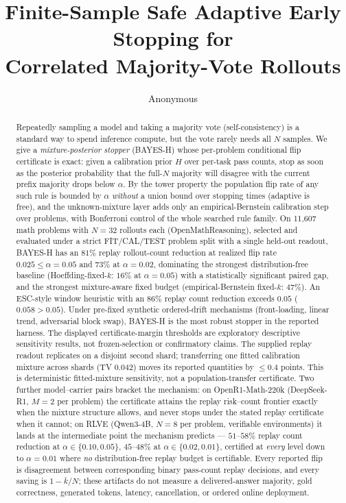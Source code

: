 \documentclass{article}
\title{Finite-Sample Safe Adaptive Early Stopping for\\
Correlated Majority-Vote Rollouts}
\author{Anonymous}
\date{}
\theoremstyle{definition}
\theoremstyle{remark}
\begin{document}
\maketitle

\begin{abstract}
Repeatedly sampling a model and taking a majority vote (self-consistency) is a
standard way to spend inference compute, but the vote rarely needs all $N$
samples. We give a
\emph{mixture-posterior stopper} (BAYES-H) whose per-problem conditional flip
certificate is exact: given a calibration prior $H$ over per-task pass counts,
stop as soon as the posterior probability that the full-$N$ majority will
disagree with the current prefix majority drops below $\alpha$. By the tower
property the population flip rate of any such rule is bounded by $\alpha$
\emph{without} a union bound over stopping times (adaptive is free), and the
unknown-mixture layer adds only an empirical-Bernstein calibration step over
problems, with Bonferroni control of the whole searched rule family.
On 11{,}607 math problems with $N=32$ rollouts each (OpenMathReasoning),
selected and evaluated under a strict FIT/CAL/TEST problem split with a single
held-out readout, BAYES-H has an $81\%$ replay rollout-count reduction at realized flip rate
$0.025\le\alpha=0.05$ and $73\%$ at $\alpha=0.02$, dominating the strongest
distribution-free baseline (Hoeffding-fixed-$k$: $16\%$ at $\alpha=0.05$) with
a statistically significant paired gap, and the strongest mixture-aware fixed
budget (empirical-Bernstein fixed-$k$: $47\%$). An ESC-style window heuristic
with an $86\%$ replay count reduction exceeds $0.05$ ($0.058>0.05$). Under
pre-fixed synthetic ordered-drift mechanisms (front-loading, linear trend,
adversarial block swap), BAYES-H is the most robust stopper in the reported
harness. The displayed certificate-margin thresholds are exploratory
descriptive sensitivity results, not frozen-selection or confirmatory claims.
The supplied replay readout replicates on a disjoint second shard; transferring
one fitted calibration mixture across shards (TV $0.042$) moves its reported
quantities by $\le0.4$ points. This is deterministic fitted-mixture sensitivity,
not a population-transfer certificate. Two further model--carrier pairs bracket the mechanism:
on OpenR1-Math-220k (DeepSeek-R1, $M=2$ per problem) the certificate attains
the replay risk--count frontier exactly when the mixture structure allows, and
never stops under the stated replay certificate when it cannot; on RLVE
(Qwen3-4B, $N=8$ per problem, verifiable environments) it
lands at the intermediate point the mechanism predicts --- $51$--$58\%$
replay count reduction at $\alpha\in\{0.10,0.05\}$, $45$--$48\%$ at
$\alpha\in\{0.02,0.01\}$, certified at \emph{every} level down to
$\alpha=0.01$ where \emph{no} distribution-free replay budget is certifiable.
Every reported flip is disagreement between corresponding binary pass-count
replay decisions, and every saving is $1-\bar k/N$; these artifacts do not
measure a delivered-answer majority, gold correctness, generated tokens,
latency, cancellation, or ordered online deployment.
\end{abstract}
\end{document}
